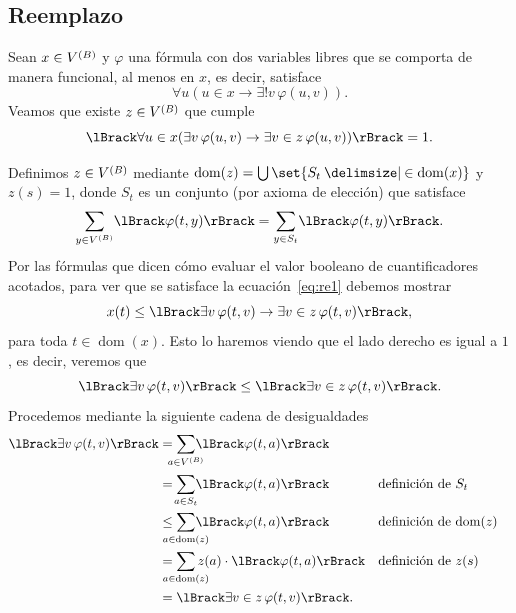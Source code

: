 \documentclass[letterpaper,DIV=15,12pt]{scrartcl}
\theoremstyle{manual}
\DeclarePairedDelimiter{\vb}{\lBrack}{\rBrack}             %
\DeclareMathOperator{\dom}{dom}                            %
\newcommand{\st}{}
\newcommand{\SetSymbol}[1][]{%
\nonscript\:#1\vert
\allowbreak
\nonscript\:
\mathopen{}}
\renewcommand\st{\SetSymbol[\delimsize]}
\begin{document}
\subsection{Reemplazo}
Sean \(x\in\mb\) y \(\varphi\) una fórmula con dos variables libres que se
comporta de manera funcional, al menos en \(x\), es decir, satisface
\begin{equation*}
  \forall u(u\in x\to \exists! v\, \varphi(u,v)).
\end{equation*}
Veamos que existe \(z\in\mb\) que cumple
\begin{equation}
  \label{eq:re1}
  \vb{\forall u\in x(\exists v\,\varphi(u,v)\to\exists v\in z\,\varphi(u,v))}
  =1.
\end{equation}

Definimos \(z\in\mb\) mediante \(\dom(z)=\bigcup\set{S_t\st\in\dom(x)}\) y
\(z(s)=1\), donde \(S_t\) es un conjunto (por axioma de elección) que satisface
\begin{equation*}
  \sum_{y\in\mb}\vb{\varphi(t,y)}=\sum_{y\in S_{t}}\vb{\varphi(t,y)}.
\end{equation*}
Por las fórmulas que dicen cómo evaluar el valor booleano de cuantificadores
acotados, para ver que se satisface la ecuación~\eqref{eq:re1} debemos mostrar
\begin{equation*}
  x(t)\leq\vb{\exists v\,\varphi(t,v)\to\exists v\in z\,\varphi(t,v)},
\end{equation*}
para toda \(t\in\dom(x)\). Esto lo haremos viendo que el lado derecho es igual a
\(1\), es decir, veremos que
\begin{equation*}
  \vb{\exists v\,\varphi(t,v)}\leq\vb{\exists v\in z\,\varphi(t,v)}.
\end{equation*}
Procedemos mediante la siguiente cadena de desigualdades
\begin{align*}
  \vb{\exists v\,\varphi(t,v)} &=
  \smashoperator{\sum_{a\in\mb}}\vb{\varphi(t,a)}\\
  &= \smashoperator{\sum_{a\in S_t}}\vb{\varphi(t,a)}
  && \text{definición de \(S_t\)}\\
  &\leq \smashoperator{\sum_{a\in\dom(z)}}\vb{\varphi(t,a)}
  && \text{definición de \(\dom(z)\)}\\
  &= \smashoperator{\sum_{a\in\dom(z)}}z(a)\cdot\vb{\varphi(t,a)}
  && \text{definición de \(z(s)\)}\\
  &= \vb{\exists v\in z\,\varphi(t,v)}.
\end{align*}
\end{document}

